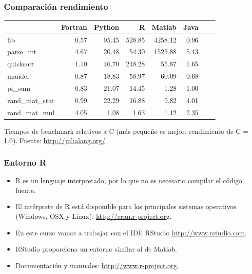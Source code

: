 \documentclass{beamer}
\begin{document}
\begin{frame}[fragile]
\frametitle{Comparación rendimiento}
\begin{center}
\begin{tabular}{lrrrrrrr}
\toprule
&Fortran&Python&R&Matlab&Java \\
\midrule
fib&0.57&95.45&528.85&4258.12&0.96 \\
parse\_int&4.67&20.48&54.30&1525.88&5.43 \\
quicksort&1.10&46.70&248.28&55.87&1.65 \\
mandel&0.87&18.83&58.97&60.09&0.68 \\
pi\_sum&0.83&21.07&14.45&1.28&1.00 \\
rand\_mat\_stat&0.99&22.29&16.88&9.82&4.01 \\
rand\_mat\_mul&4.05&1.08&1.63&1.12&2.35 \\
\bottomrule
\end{tabular}
\vspace*{1em}

Tiempos de benchmark relativos a C (más pequeño es mejor, rendimiento de C = 1.0). Fuente: \url{http://julialang.org/}
\end{center}
\end{frame}

\begin{frame}
\frametitle{Entorno R}

\begin{itemize}
\item R es un lenguaje interpretado, por lo que no es necesario compilar el código fuente.
\item El intérprete de R está disponible para los principales sistemas operativos (Windows, OSX y Linux): \url{http://cran.r-project.org}.
\item En este curso vamos a trabajar con el IDE RStudio \url{http://www.rstudio.com}.
\item RStudio proporciona un entorno similar al de Matlab.
\item Documentación y manuales: \url{http://www.r-project.org}.
\end{itemize}
\end{frame}
\end{document}
